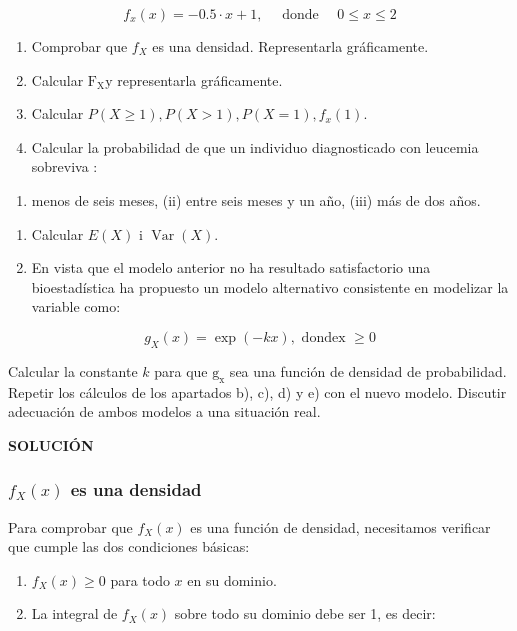 \documentclass[
]{article}
\providecommand{\tightlist}{%
  \setlength{\itemsep}{0pt}\setlength{\parskip}{0pt}}
\begin{document}
\[
f_{x}(x)=-0.5 \cdot x+1, \quad \text { donde } \quad 0 \leq x \leq 2
\]

\begin{enumerate}
\def\labelenumi{\arabic{enumi}.}
\item
  Comprobar que \(f_{X}\) es una densidad. Representarla gráficamente.
\item
  Calcular \(\mathrm{F}_{\mathrm{X}} \mathrm{y}\) representarla gráficamente.
\item
  Calcular \(P(X \geq 1), P(X>1), P(X=1), f_{x}(1)\).
\item
  Calcular la probabilidad de que un individuo diagnosticado con leucemia sobreviva :
\end{enumerate}

\begin{enumerate}
\def\labelenumi{(\roman{enumi})}
\tightlist
\item
  menos de seis meses, (ii) entre seis meses y un año, (iii) más de dos años.
\end{enumerate}

\begin{enumerate}
\def\labelenumi{\arabic{enumi}.}
\setcounter{enumi}{4}
\item
  Calcular \(E(X)\) i \(\operatorname{Var}(X)\).
\item
  En vista que el modelo anterior no ha resultado satisfactorio una bioestadística ha propuesto un modelo alternativo consistente en modelizar la variable como:
\end{enumerate}

\[
g_{X}(x)=\exp (-k x), \text { dondex } \geq 0
\]

Calcular la constante \(k\) para que \(\mathrm{g}_{\mathrm{x}}\) sea una función de densidad de probabilidad. Repetir los cálculos de los apartados b), c), d) y e) con el nuevo modelo. Discutir adecuación de ambos modelos a una situación real.

\textbf{SOLUCIÓN}

\subsubsection{\texorpdfstring{\(f_X(x)\) es una densidad}{f\_X(x) es una densidad}}\label{f_xx-es-una-densidad}

Para comprobar que \(f_X(x)\) es una función de densidad, necesitamos verificar que cumple las dos condiciones básicas:

\begin{enumerate}
\def\labelenumi{\arabic{enumi}.}
\tightlist
\item
  \(f_X(x) \geq 0\) para todo \(x\) en su dominio.
\item
  La integral de \(f_X(x)\) sobre todo su dominio debe ser 1, es decir:
\end{enumerate}
\end{document}
